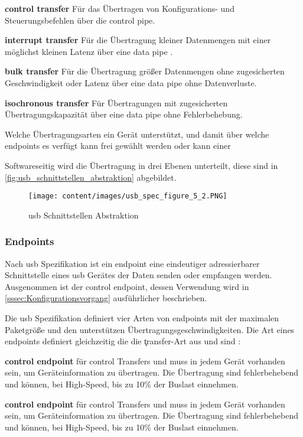 \begin{compactitem}
    \item \textbf{control transfer} Für das Übertragen von Konfigurations- und Steuerungsbefehlen über die control pipe.
    \item \textbf{interrupt transfer} Für die Übertragung kleiner Datenmengen mit einer möglichst kleinen Latenz über eine data pipe .
    \item \textbf{bulk transfer} Für die Übertragung grö{\ss}er Datenmengen ohne zugesicherten Geschwindigkeit oder Latenz über eine data pipe ohne Datenverluste.
    \item \textbf{isochronous transfer}  Für Übertragungen mit zugesicherten Übertragungskapazität über eine data pipe ohne Fehlerbehebung.
\end{compactitem}
Welche Übertragungsarten ein Gerät unterstützt, und damit über welche endpoints es verfügt kann frei gewählt werden oder kann einer %

Softwareseitig wird die Übertragung in drei Ebenen unterteilt, diese sind in \autoref{fig:usb_schnittstellen_abstraktion} abgebildet.
\begin{figure}[h]
    \centering
    \texttt{[image: content/images/usb\_spec\_figure\_5\_2.PNG]}
    \caption{\acrshort{usb} Schnittstellen Abstraktion \cite[Figure~5-2]{usb_developer_guide}}
    \label{fig:usb_schnittstellen_abstraktion}
\end{figure}



\subsubsection{Endpoints} \label{sssec:endpoints}
Nach  \acrshort{usb} Spezifikation ist ein endpoint eine eindeutiger adressierbarer Schnittstelle eines \acrshort{usb} Gerätes der Daten senden oder empfangen werden. Ausgenommen ist der control endpoint, dessen Verwendung wird in \autoref{sssec:Konfigurationsvorgang} ausführlicher beschrieben.

Die \acrshort{usb} Spezifikation definiert vier Arten von endpoints mit der maximalen Paketgrö{\ss}e und den unterstützen Übertragungsgeschwindigkeiten. Die Art eines endpoints definiert gleichzeitig die die \k{transfer}-Art aus  und sind \cite[Kapitel~8]{usb_developer_guide}:
\begin{compactitem}
    \item \textbf{control endpoint} für control Transfers und muss in jedem Gerät vorhanden sein, um Geräteinformation zu übertragen. Die Übertragung sind fehlerbehebend und können, bei High-Speed, bis zu 10\% der Buslast einnehmen.
    \item \textbf{control endpoint} für control Transfers und muss in jedem Gerät vorhanden sein, um Geräteinformation zu übertragen. Die Übertragung sind fehlerbehebend und können, bei High-Speed, bis zu 10\% der Buslast einnehmen.
\end{compactitem}

